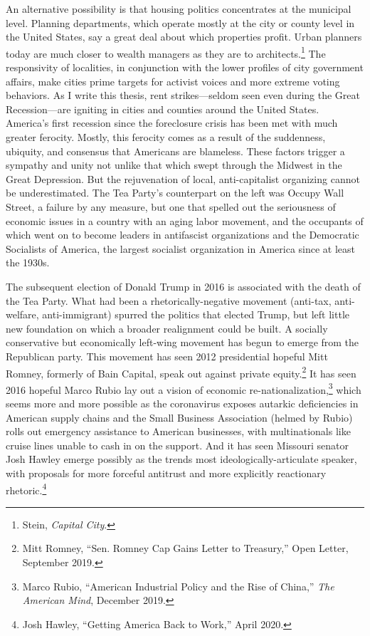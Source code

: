 \documentclass[12pt,oneside]{psthesis}
\begin{document}
An alternative possibility is that housing politics concentrates at the municipal level.
Planning departments, which operate mostly at the city or county level in the United States, say a great deal about which properties profit.
Urban planners today are much closer to wealth managers as they are to architects.\footnote{Stein, \emph{Capital City}.}
The responsivity of localities, in conjunction with the lower profiles of city government affairs, make cities prime targets for activist voices and more extreme voting behaviors.
As I write this thesis, rent strikes---seldom seen even during the Great Recession---are igniting in cities and counties around the United States.
America's first recession since the foreclosure crisis has been met with much greater ferocity.
Mostly, this ferocity comes as a result of the suddenness, ubiquity, and consensus that Americans are blameless.
These factors trigger a sympathy and unity not unlike that which swept through the Midwest in the Great Depression.
But the rejuvenation of local, anti-capitalist organizing cannot be underestimated.
The Tea Party's counterpart on the left was Occupy Wall Street, a failure by any measure, but one that spelled out the seriousness of economic issues in a country with an aging labor movement, and the occupants of which went on to become leaders in antifascist organizations and the Democratic Socialists of America, the largest socialist organization in America since at least the 1930s.

The subsequent election of Donald Trump in 2016 is associated with the death of the Tea Party.
What had been a rhetorically-negative movement (anti-tax, anti-welfare, anti-immigrant) spurred the politics that elected Trump, but left little new foundation on which a broader realignment could be built.
A socially conservative but economically left-wing movement has begun to emerge from the Republican party.
This movement has seen 2012 presidential hopeful Mitt Romney, formerly of Bain Capital, speak out against private equity.\footnote{Mitt Romney, ``Sen. Romney Cap Gains Letter to Treasury,'' Open Letter, September 2019.}
It has seen 2016 hopeful Marco Rubio lay out a vision of economic re-nationalization,\footnote{Marco Rubio, ``American Industrial Policy and the Rise of China,'' \emph{The American Mind}, December 2019.} which seems more and more possible as the coronavirus exposes autarkic deficiencies in American supply chains and the Small Business Association (helmed by Rubio) rolls out emergency assistance to American businesses, with multinationals like cruise lines unable to cash in on the support.
And it has seen Missouri senator Josh Hawley emerge possibly as the trends most ideologically-articulate speaker, with proposals for more forceful antitrust and more explicitly reactionary rhetoric.\footnote{Josh Hawley, ``Getting America Back to Work,'' April 2020.}
\end{document}
